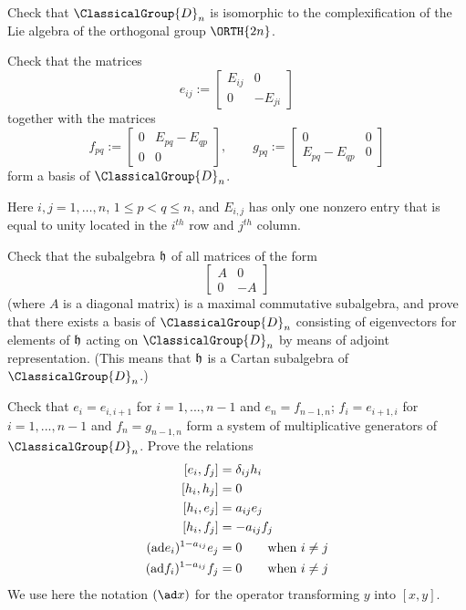 \begin{exercise}
Check that $\ClassicalGroup{D}_{n}$ is isomorphic to the complexification of the
Lie algebra of the orthogonal group $\ORTH{2n}$.
\end{exercise}
\begin{exercise}
Check that the matrices
\begin{equation}
e_{ij}:=\begin{bmatrix}E_{ij}&0\\
0&-E_{ji}
\end{bmatrix}
\end{equation}
together with the matrices
\begin{equation}
f_{pq}:=\begin{bmatrix}0&E_{pq}-E_{qp}\\
0&0
\end{bmatrix},\qquad
g_{pq}:=\begin{bmatrix}0&0\\
E_{pq}-E_{qp}&0
\end{bmatrix}
\end{equation}
form a basis of $\ClassicalGroup{D}_{n}$. 

Here $i,j=1,\ldots,n$, $1\leq p<q\leq n$, and $E_{i,j}$ has only
one nonzero entry that is equal to unity located in the $i^{th}$
row and $j^{th}$ column.
\end{exercise}
\begin{exercise}
Check that the subalgebra $\frak{h}$ of all matrices of the form
\begin{equation}
\begin{bmatrix}
A&0\\
0&-A
\end{bmatrix}
\end{equation}
(where $A$ is a diagonal matrix) is a maximal commutative
subalgebra, and prove that there exists a basis of $\ClassicalGroup{D}_{n}$
consisting of eigenvectors for elements of $\frak{h}$ acting on
$\ClassicalGroup{D}_{n}$ by means of adjoint representation. (This means that
$\frak{h}$ is a Cartan subalgebra of $\ClassicalGroup{D}_{n}$.)
\end{exercise}
\begin{exercise}
Check that $e_{i}=e_{i,i+1}$ for $i=1,...,n-1$ and
$e_{n}=f_{n-1,n}$; $f_{i}=e_{i+1,i}$ for $i=1,...,n-1$ and
$f_{n}=g_{n-1,n}$ form a system of multiplicative generators of
$\ClassicalGroup{D}_{n}$. Prove the relations
\begin{subequations}
\begin{align}
[e_{i},f_{j}]&=\delta_{ij}h_{i}\\
[h_{i},h_{j}]&=0\\
[h_{i},e_{j}]&=a_{ij}e_{j}\\
[h_{i},f_{j}]&=-a_{ij}f_{j}\\
({\rm ad}e_{i})^{1-a_{ij}}e_{j}&=0\qquad\mbox{when $i\not=j$}\\
({\rm ad}f_{i})^{1-a_{ij}}f_{j}&=0\qquad\mbox{when $i\not=j$}
\end{align}
\end{subequations}
We use here the notation $(\ad x)$ for the operator transforming $y$ into $[x,y]$.
\end{exercise}

